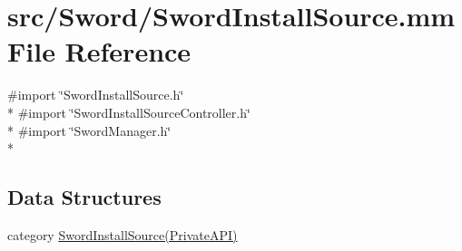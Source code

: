 \hypertarget{_sword_install_source_8mm}{\section{src/\-Sword/\-Sword\-Install\-Source.mm File Reference}
\label{_sword_install_source_8mm}
}
{\ttfamily \#import \char`\"{}Sword\-Install\-Source.\-h\char`\"{}}\\*
{\ttfamily \#import \char`\"{}Sword\-Install\-Source\-Controller.\-h\char`\"{}}\\*
{\ttfamily \#import \char`\"{}Sword\-Manager.\-h\char`\"{}}\\*
\subsection*{Data Structures}
\begin{DoxyCompactItemize}
\item 
category \hyperlink{category_sword_install_source_07_private_a_p_i_08}{Sword\-Install\-Source(\-Private\-A\-P\-I)}
\end{DoxyCompactItemize}
